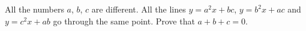 \problem
All the numbers $a$, $b$, $c$ are different. All the lines $y = a^2x + bc$, $y = b^2x + ac$ and $y = c^2x + ab$ go through the same point. Prove that $a + b + c = 0$.
\solution
\endproblem
